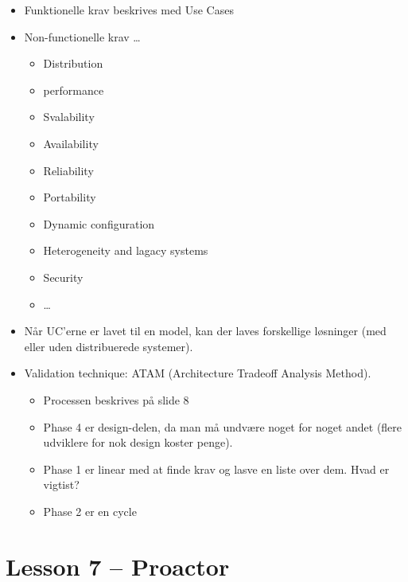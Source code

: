 \documentclass[oneside, 10pt]{memoir}
\begin{document}
\begin{itemize}
	\item Funktionelle krav beskrives med Use Cases
	
	\item Non-functionelle krav \dots
	
	\begin{itemize}
		\item Distribution
		\item performance
		\item Svalability
		\item Availability
		\item Reliability
		\item Portability
		\item Dynamic configuration
		\item Heterogeneity and lagacy systems
		\item Security
		\item \dots
	\end{itemize}
	
	\item Når UC'erne er lavet til en model, kan der laves forskellige løsninger (med eller uden distribuerede systemer).
	
	\item Validation technique: ATAM (Architecture Tradeoff Analysis Method).
	
	\begin{itemize}
		\item Processen beskrives på slide 8
		\item Phase 4 er design-delen, da man må undvære noget for noget andet (flere udviklere for nok design koster penge).
		\item Phase 1 er linear med at finde krav og lasve en liste over dem. Hvad er vigtist?
		\item Phase 2 er en cycle
	\end{itemize}


\end{itemize}




\newpage
\section*{Lesson 7 -- Proactor}
\end{document}
